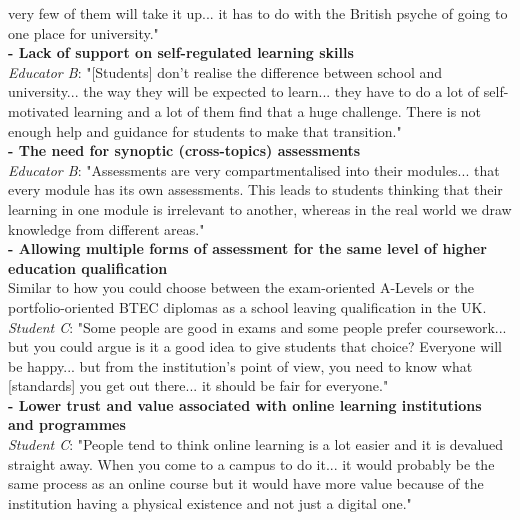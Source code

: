 very few of them will take it up... it has to do with the British psyche of going to one place for 
university."
\vspace{0.25cm}\\
\textbf{- Lack of support on self-regulated learning skills}\\
\textit{Educator B}: "[Students] don't realise the difference between school and university... the way 
they will be expected to learn... they have to do a lot of self-motivated learning and a lot of them 
find that a huge challenge. There is not enough help and guidance for students to make that transition."
\vspace{0.25cm}\\
\textbf{- The need for synoptic (cross-topics) assessments}\\
\textit{Educator B}: "Assessments are very compartmentalised into their modules... that every module has 
its own assessments. This leads to students thinking that their learning in one module is irrelevant 
to another, whereas in the real world we draw knowledge from different areas."
\vspace{0.25cm}\\
\textbf{- Allowing multiple forms of assessment for the same level of higher education qualification}\\
Similar to how you could choose between the exam-oriented A-Levels or the portfolio-oriented BTEC diplomas 
as a school leaving qualification in the UK.\\
\textit{Student C}: "Some people are good in exams and some people prefer coursework... but you could 
argue is it a good idea to give students that choice? Everyone will be happy... but from the institution's 
point of view, you need to know what [standards] you get out there... it should be fair for everyone."
\vspace{0.25cm}\\
\textbf{- Lower trust and value associated with online learning institutions and programmes}\\
\textit{Student C}: "People tend to think online learning is a lot easier and it is devalued straight away. 
When you come to a campus to do it... it would probably be the same process as an online course but 
it would have more value because of the institution having a physical existence and not just a digital one."
\vspace{0.25cm}\\


